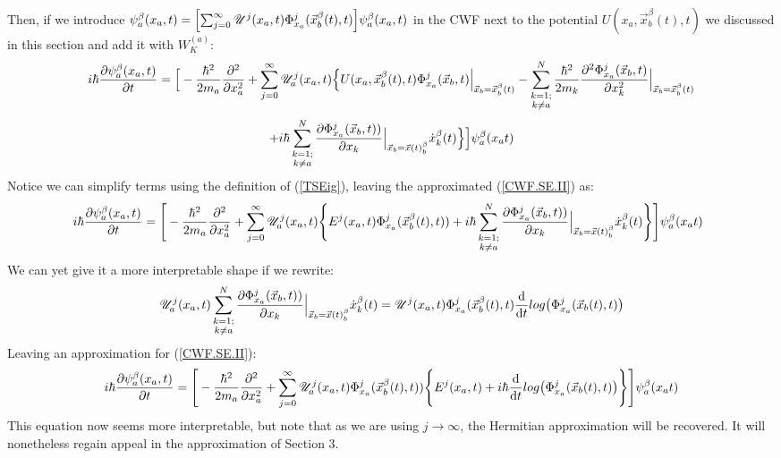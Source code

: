 \documentclass[11pt, a4paper]{article} %
\newcommand{\U}{\mathscr{U}}
\begin{document}
Then, if we introduce $\psi^\beta_a(x_a,t)=\qty[ \sum_{j=0}^\infty\U^j(x_a,t)\Phi^j_{x_a}(\vec{x}_b^\beta(t),t)]\psi^\beta_a(x_a,t)$ in the CWF next to the potential $U(x_a,\vec{x}_b^\beta(t),t)$ we discussed in this section and add it with $W^{(a)}_K$:
$$
i\hbar \pdv{\psi_a^\beta(x_a, t)}{t} = \Big[- \frac{\hbar^2}{2m_a}\pdv[2]{}{x_a} +\sum_{j=0}^\infty \U^j_a(x_a,t)\Big\{ U(x_a, \vec{x}_b^\beta(t), t)\Phi_{x_a}^j(\vec{x}_b,t)\Big\rvert_{\vec{x}_b=\vec{x}_b^\beta(t)}- \sum_{\substack{k=1; \\ k\neq a}}^{N} \frac{\hbar^2}{2m_k} \pdv[2]{ \Phi_{x_a}^j(\vec{x}_b,t)}{x_k}\Big\rvert_{\vec{x}_b=\vec{x}_b^\beta(t)}
$$
$$  +i\hbar \sum_{\substack{k=1; \\ k\neq a}}^{N}  \pdv{ \Phi_{x_a}^j(\vec{x}_b,t))}{x_k}\Big\rvert_{\vec{x}_b=\vec{x}(t)_b^\beta} \dot{x}_k^\beta(t) \Big\}\Big]\psi_a^\beta(x_a t)
$$
Notice we can simplify terms using the definition of (\ref{TSEig}), leaving the approximated (\ref{CWF.SE.II}) as:
$$
\hspace{-0.2cm} i\hbar \pdv{\psi_a^\beta(x_a, t)}{t} = \Bigg[- \frac{\hbar^2}{2m_a}\pdv[2]{}{x_a} +\sum_{j=0}^\infty \U^j_a(x_a,t)\Bigg\{ E^j(x_a,t) \Phi_{x_a}^j(\vec{x}_b^\beta(t),t))+i\hbar \sum_{\substack{k=1; \\ k\neq a}}^{N}  \pdv{ \Phi_{x_a}^j(\vec{x}_b,t))}{x_k}\Big\rvert_{\vec{x}_b=\vec{x}(t)_b^\beta} \dot{x}_k^\beta(t) \Bigg\}\Bigg]\psi_a^\beta(x_a t)
$$
We can yet give it a more interpretable shape if we rewrite:
$$
\U^j_a(x_a,t)\sum_{\substack{k=1; \\ k\neq a}}^{N} \pdv{ \Phi_{x_a}^j(\vec{x}_b,t))}{x_k}\Big\rvert_{\vec{x}_b=\vec{x}(t)_b^\beta} \dot{x}_k^\beta(t)= \U^j(x_a,t)\Phi^j_{x_a}(\vec{x}_b^\beta(t),t)\dv{}{t}log\qty(\Phi^j_{x_a}(\vec{x}_b(t),t))
$$
Leaving an approximation for (\ref{CWF.SE.II}):
$$
i\hbar \pdv{\psi_a^\beta(x_a, t)}{t} = \Bigg[- \frac{\hbar^2}{2m_a}\pdv[2]{}{x_a} +\sum_{j=0}^\infty \U^j_a(x_a,t)\Phi_{x_a}^j(\vec{x}_b^\beta(t),t))\Bigg\{ E^j(x_a,t) +i\hbar \dv{}{t}log\qty(\Phi^j_{x_a}(\vec{x}_b(t),t)) \Bigg\}\Bigg]\psi_a^\beta(x_a t)
$$
This equation now seems more interpretable, but note that as we are using $j\rightarrow \infty$, the Hermitian approximation will be recovered. It will nonetheless regain appeal in the approximation of Section 3.
\end{document}
